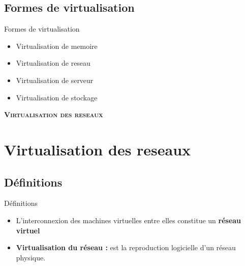 \documentclass[12pt, c]{beamer}
\begin{document}
		\subsection{Formes de virtualisation}
			\begin{frame}{Formes de virtualisation}
				\transwipe
				\vspace{-0.25cm}
				\begin{block}{}
					\begin{itemize}
						\item
							Virtualisation de memoire
							
						\item
							Virtualisation de reseau
							
						\item
							Virtualisation de serveur
							
						\item
							Virtualisation de stockage
					\end{itemize}
				\end{block}
			\end{frame}
\begin{frame}
	\transdissolve
	\vspace{1cm}
		\begin{center}
			\huge \textbf{\textsc{Virtualisation des reseaux}}
		\end{center}
	\end{frame}

\section{Virtualisation des reseaux}
	\subsection{Définitions}
		\begin{frame}{Définitions}
			\transwipe
			\vspace{-0.25cm}
			\begin{block}{}
				\begin{itemize}
					\item 
						\begin{flushleft}
							L’interconnexion des machines virtuelles entre elles constitue un
							\textbf{réseau virtuel} 
						\end{flushleft}
					\item
						\begin{flushleft}
							\textbf{Virtualisation du réseau : } est la reproduction
							logicielle d’un réseau physique. 
						\end{flushleft}
				\end{itemize}
			\end{block}
			\end{frame}
\end{document}
